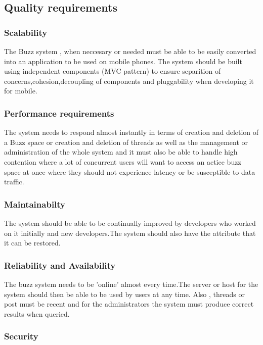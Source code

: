 \documentclass[10pt]{article}
\begin{document}
\subsection{Quality requirements} %
\subsubsection{Scalability}

The  Buzz system , when neccesary or needed  must be able to be easily converted into an application to be used on mobile phones. The system should be built using independent components (MVC pattern)  to ensure separition of concerns,cohesion,decoupling of components and pluggability when developing it for mobile.

\subsubsection{Performance requirements}

The system needs to respond almost instantly in terms of creation and deletion of a Buzz space or creation and deletion of threads as well as the management or administration of the whole system and it must also be able to handle high contention where a lot of concurrent users will want to access an actice buzz space at once where they should not experience latency or be susceptible to data traffic.

\subsubsection{Maintainabilty}

The system should be able to be continually improved by developers who worked on it initially and new developers.The system should also have the attribute that it can be restored.

\subsubsection{Reliability and Availability}

The buzz system needs to be 'online' almost every time.The server or host for the system should then be able to be used by users at any time. Also , threads or post must be recent and for the administrators the system must produce correct results when queried.


\subsubsection{Security}
\end{document}
